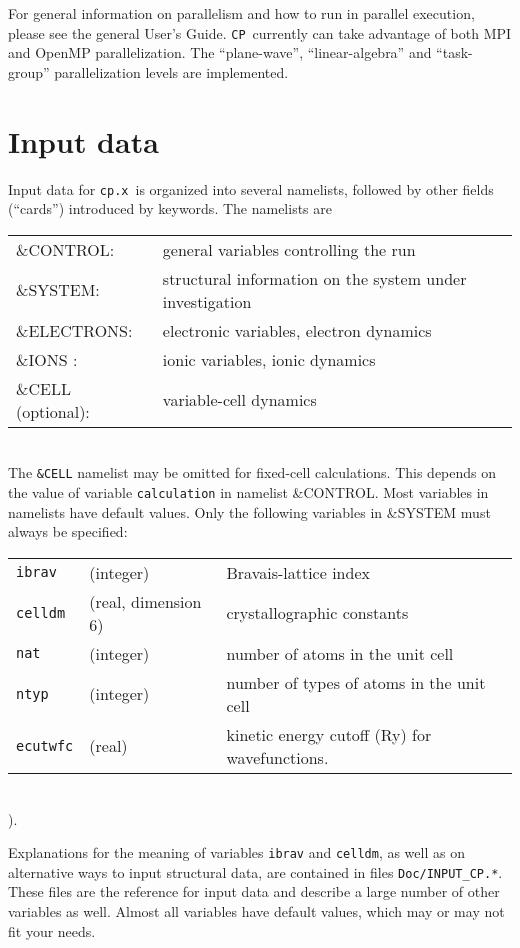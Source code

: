 \documentclass[12pt,a4paper]{article}
\def\cpx{\texttt{cp.x}}
\def\CP{\texttt{CP}}
\begin{document}
For general information on parallelism and how 
to run in parallel execution, please see the general User's Guide. \CP\  currently can take advantage
of both MPI and OpenMP parallelization. The
``plane-wave'', ``linear-algebra'' and ``task-group''
parallelization levels are implemented.
  
\section{Input data}

Input data for \cpx\ is organized into several namelists, followed by other 
fields (``cards'') introduced by keywords. The namelists are

\begin{tabular}{ll}
      \&CONTROL:& general variables controlling the run\\
      \&SYSTEM: &structural information on the system under investigation\\
      \&ELECTRONS: &electronic variables, electron dynamics\\
      \&IONS : &ionic variables, ionic dynamics\\
      \&CELL (optional): &variable-cell  dynamics\\
\end{tabular}
 \\
The \texttt{\&CELL} namelist may be omitted for
fixed-cell calculations. This depends on the value of variable \texttt{calculation}
in namelist \&CONTROL. Most variables in namelists have default values. Only
the following variables in \&SYSTEM must always be specified:

\begin{tabular}{lll}
      \texttt{ibrav} & (integer)& Bravais-lattice index\\
      \texttt{celldm} &(real, dimension 6)& crystallographic constants\\
      \texttt{nat} &(integer)& number of atoms in the unit cell\\
      \texttt{ntyp} &(integer)& number of types of atoms in the unit cell\\
      \texttt{ecutwfc} &(real)& kinetic energy cutoff (Ry) for wavefunctions.
\end{tabular}    \\).
    
Explanations for the meaning of variables \texttt{ibrav} and \texttt{celldm},
as well as on alternative ways to input structural data,
are contained in files \texttt{Doc/INPUT\_CP.*}. These files are the reference for input data and describe 
a large number of other variables as well. Almost all variables have default 
values, which may or may not fit your needs.
\end{document}
